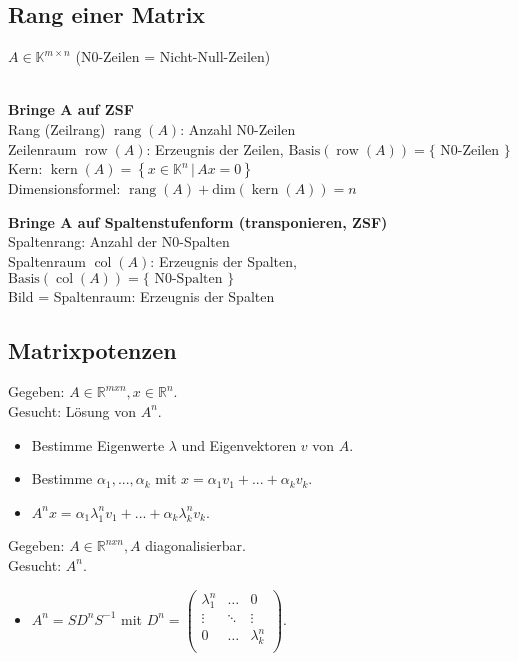 \documentclass[german, 6pt]{latex4ei/latex4ei_sheet}
\newcommand{\dme}[2]{\ensuremath{\left\{#1\,\vert\,#2 \right\}}}
\DeclareMathOperator{\rang}{rang}
\DeclareMathOperator{\col}{col}
\DeclareMathOperator{\row}{row}
\DeclareMathOperator{\Kern}{kern}
\begin{document}
\subsection{Rang einer Matrix}
$A\in \mathbb K^{m\times n}$ 
{(N0-Zeilen = Nicht-Null-Zeilen)}\\ \\
\begin{minipage}{\columnwidth}
\textbf{Bringe A auf ZSF} \\
Rang (Zeilrang) $\rang(A)$: Anzahl N0-Zeilen \\     
Zeilenraum $\row(A)$: Erzeugnis der Zeilen, $\text{Basis}(\row(A)) = \{\text{ N0-Zeilen }\}$ \\
Kern: $\Kern(A) = \dme{x \in \mathbb K^n}{Ax= 0}$ \\
Dimensionsformel: $\rang(A) + \mathrm{dim}(\Kern(A)) = n$ \\
\end{minipage}
\begin{minipage}{\columnwidth}
\textbf{Bringe A auf Spaltenstufenform (transponieren, ZSF)} \\
Spaltenrang: Anzahl der N0-Spalten\\
Spaltenraum $\col(A)$: Erzeugnis der Spalten, $\text{Basis}(\col(A)) = \{\text{ N0-Spalten }\}$ \\
Bild = Spaltenraum: Erzeugnis der Spalten 
\end{minipage}
\begin{minipage}{\columnwidth}
\subsection{Matrixpotenzen}
Gegeben: $A \in\mathbb{R}^{mxn}, x \in\mathbb{R}^n$.\\
Gesucht: Lösung von $A^n$.\\
\begin{itemize}
	\item Bestimme Eigenwerte $\lambda$ und Eigenvektoren $v$ von $A$.
	\item Bestimme $\alpha_1, ..., \alpha_k$ mit $x = \alpha_1v_1 + ... + \alpha_kv_k$.
	\item $A^nx = \alpha_1\lambda_1^nv_1+ ... + \alpha_k\lambda_k^nv_k$.
\end{itemize}
Gegeben: $A \in\mathbb{R}^{nxn}, A$ diagonalisierbar.\\
Gesucht: $A^n$.
\begin{itemize}
	\item $A^n = SD^nS^{-1}$ mit $D^n = \begin{pmatrix}
	\lambda_1^n & \ldots & 0 \\
	\vdots & \ddots & \vdots\\
	0 & \ldots & \lambda_k^n \\
	\end{pmatrix}$.
\end{itemize}
\end{minipage}
\end{document}
